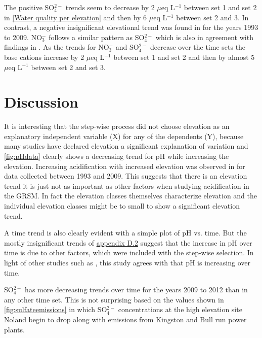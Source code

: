 The positive SO$_4^{2-}$ trends seem to decrease by 2 $\mu$eq L$^{-1}$ between set 1 and set 2 in \autoref{Water quality per elevation} and then by 6  $\mu$eq L$^{-1}$ between set 2 and 3.  
In contrast, a negative insignificant elevational trend was found in \citet{cai2013} for the years 1993 to 2009.  
NO$_3^-$ follows a similar pattern as SO$_4^{2-}$ which is also in agreement with findings in \citet{weathers2006}.  
As the trends for  NO$_3^-$ and SO$_4^{2-}$ decrease over the time sets the base cations increase by 2 $\mu$eq L$^{-1}$ between set 1 and set 2 and then by almost 5 $\mu$eq L$^{-1}$ between set 2 and set 3.

\section{Discussion}%

It is interesting that the step-wise process did not choose elevation as an explanatory independent variable (X) for any of the dependents (Y), because many studies have declared elevation a significant explanation of variation and \autoref{fig:pHdata} clearly shows a decreasing trend for pH while increasing the elevation. 
Increasing acidification with increased elevation was observed in \citet{cai2013} for data collected between 1993 and 2009.
This suggests that there is an elevation trend it is just not as important as other factors when studying acidification in the GRSM.
In fact the elevation classes themselves characterize elevation and the individual elevation classes might be to small to show a significant elevation trend.  

A time trend is also clearly evident with a simple plot of pH vs. time.
But the mostly insignificant trends of  \hyperref[app:time vars]{appendix D.2} suggest that the increase in pH over time is due to other factors, which were included with the step-wise selection. 
In light of other studies such as \citet{robinson2008ph}, this study agrees with \citet{cai2013} that pH is increasing over time.

SO$_4^{2-}$ has more decreasing trends over time for the years 2009 to 2012 than in any other time set.
This is not surprising based on the values shown in \autoref{fig:sulfateemissions} in which SO$_4^{2-}$ concentrations at the high elevation site Noland begin to drop along with emissions from Kingston and Bull run power plants.  


